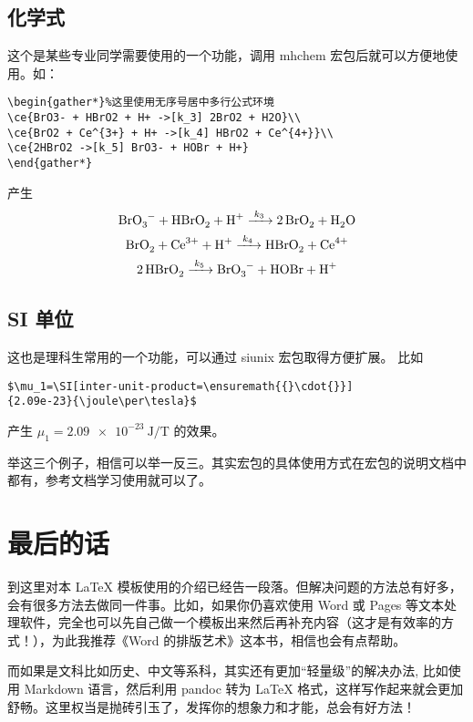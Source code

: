 \subsection{化学式}
这个是某些专业同学需要使用的一个功能，调用 mhchem 宏包后就可以方便地使用。如：
\begin{Verbatim}[frame=single]
\begin{gather*}%这里使用无序号居中多行公式环境
\ce{BrO3- + HBrO2 + H+ ->[k_3] 2BrO2 + H2O}\\
\ce{BrO2 + Ce^{3+} + H+ ->[k_4] HBrO2 + Ce^{4+}}\\
\ce{2HBrO2 ->[k_5] BrO3- + HOBr + H+}
\end{gather*}
\end{Verbatim}
产生
\begin{gather*}%
\ce{BrO3- + HBrO2 + H+ ->[k_3] 2BrO2 + H2O}\\
\ce{BrO2 + Ce^{3+} + H+ ->[k_4] HBrO2 + Ce^{4+}}\\
\ce{2HBrO2 ->[k_5] BrO3- + HOBr + H+}
\end{gather*}

\subsection{SI 单位}
这也是理科生常用的一个功能，可以通过 siunix 宏包取得方便扩展。
比如 
\begin{Verbatim}[frame=single]
$\mu_1=\SI[inter-unit-product=\ensuremath{{}\cdot{}}]
{2.09e-23}{\joule\per\tesla}$
\end{Verbatim}
产生 $\mu_1=\SI[inter-unit-product=\ensuremath{{}\cdot{}}]{2.09e-23}{\joule\per\tesla}$ 的效果。

举这三个例子，相信可以举一反三。其实宏包的具体使用方式在宏包的说明文档中都有，参考文档学习使用就可以了。
\section{最后的话}
到这里对本 LaTeX 模板使用的介绍已经告一段落。但解决问题的方法总有好多，会有很多方法去做同一件事。比如，如果你仍喜欢使用 Word 或 Pages 等文本处理软件，完全也可以先自己做一个模板出来然后再补充内容（这才是有效率的方式！），为此我推荐《Word 的排版艺术》这本书，相信也会有点帮助。

而如果是文科比如历史、中文等系科，其实还有更加“轻量级”的解决办法, 比如使用 Markdown 语言，然后利用 pandoc 转为 LaTeX 格式，这样写作起来就会更加舒畅。这里权当是抛砖引玉了，发挥你的想象力和才能，总会有好方法！
